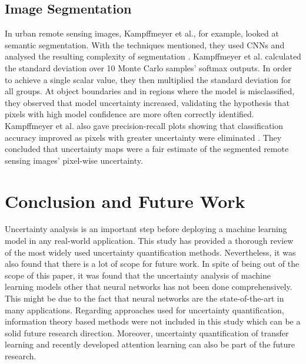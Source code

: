 \documentclass[journal]{IEEEtran}
\begin{document}
\subsection{Image Segmentation}
In urban remote sensing images, Kampffmeyer et
al., for example, looked at semantic segmentation.
With the techniques mentioned, they used CNNs
and analysed the resulting complexity of segmentation \cite{loquercio2020general}.
Kampffmeyer et al. calculated the standard deviation
over 10 Monte Carlo samples' softmax outputs.
In order to achieve a single scalar value, they
then multiplied the standard deviation for all groups.
At object boundaries and in regions where the model is misclassified, they observed that model
uncertainty increased, validating the hypothesis that pixels with high model confidence are more often correctly identified. 
Kampffmeyer et al. also gave precision-recall plots showing that
classification accuracy improved as pixels with greater uncertainty were eliminated \cite{loquercio2020general}.
They concluded that uncertainty maps were a fair
estimate of the segmented remote sensing images' pixel-wise uncertainty. 


\section{Conclusion and Future Work}
Uncertainty analysis is an important step before deploying a machine learning model in any real-world application. This study has provided a thorough review of the most widely used uncertainty quantification methods. Nevertheless, it was also found that there is a lot of scope for future work. In spite of being out of the scope of this paper, it was found that the uncertainty analysis of machine learning models other that neural networks has not been done comprehensively. This might be due to the fact that neural networks are the state-of-the-art in many applications. Regarding approaches used for uncertainty quantification, information theory based methods were not included in this study which can be a solid future research direction. Moreover, uncertainty quantification of transfer learning and recently developed attention learning can also be part of the future research.



 


\end{document}
